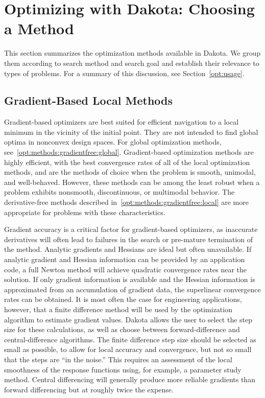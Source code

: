 \section{Optimizing with Dakota: Choosing a Method}
\label{opt:methods}

This section summarizes the optimization methods available in
Dakota. We group them according to search method and search goal and
establish their relevance to types of problems. For a summary of this
discussion, see Section~\ref{opt:usage}.

\subsection{Gradient-Based Local Methods}
\label{opt:methods:gradient}

Gradient-based optimizers are best suited for efficient navigation to
a local minimum in the vicinity of the initial point.  They are not
intended to find global optima in nonconvex design spaces.  For global
optimization methods, see~\ref{opt:methods:gradientfree:global}.
Gradient-based optimization methods are highly efficient, with the
best convergence rates of all of the local optimization methods, and
are the methods of choice when the problem is smooth, unimodal, and
well-behaved. However, these methods can be among the least robust
when a problem exhibits nonsmooth, discontinuous, or multimodal
behavior.  The derivative-free methods described
in~\ref{opt:methods:gradientfree:local} are more appropriate for
problems with these characteristics.

Gradient accuracy is a critical factor for gradient-based optimizers,
as inaccurate derivatives will often lead to failures in the search or
pre-mature termination of the method.  Analytic gradients and Hessians
are ideal but often unavailable.  If analytic gradient and Hessian
information can be provided by an application code, a full Newton
method will achieve quadratic convergence rates near the solution. If
only gradient information is available and the Hessian information is
approximated from an accumulation of gradient data, the superlinear
convergence rates can be obtained.  It is most often the case for
engineering applications, however, that a finite difference method
will be used by the optimization algorithm to estimate gradient
values. Dakota allows the user to select the step size for these
calculations, as well as choose between forward-difference and
central-difference algorithms. The finite difference step size should
be selected as small as possible, to allow for local accuracy and
convergence, but not so small that the steps are ``in the noise.''
This requires an assessment of the local smoothness of the response
functions using, for example, a parameter study method. Central
differencing will generally produce more reliable gradients than
forward differencing but at roughly twice the expense.

